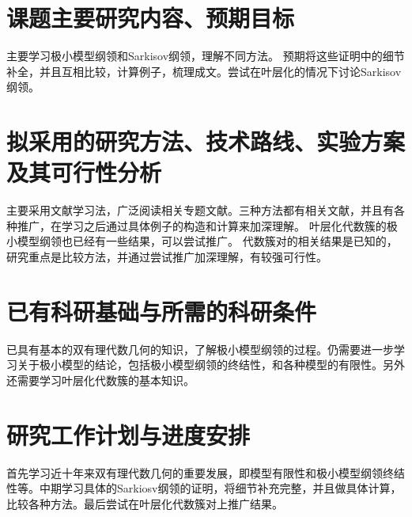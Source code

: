 \section{课题主要研究内容、预期目标}
主要学习极小模型纲领和Sarkisov纲领，理解不同方法。
预期将这些证明中的细节补全，并且互相比较，计算例子，梳理成文。尝试在叶层化的情况下讨论Sarkisov纲领。

\section{拟采用的研究方法、技术路线、实验方案及其可行性分析}
主要采用文献学习法，广泛阅读相关专题文献。三种方法都有相关文献，并且有各种推广，在学习之后通过具体例子的构造和计算来加深理解。
叶层化代数簇的极小模型纲领也已经有一些结果，可以尝试推广。
代数簇对的相关结果是已知的，研究重点是比较方法，并通过尝试推广加深理解，有较强可行性。

\section{已有科研基础与所需的科研条件}
已具有基本的双有理代数几何的知识，了解极小模型纲领的过程。仍需要进一步学习关于极小模型的结论，包括极小模型纲领的终结性，和各种模型的有限性。另外还需要学习叶层化代数簇的基本知识。
\section{研究工作计划与进度安排}

首先学习近十年来双有理代数几何的重要发展，即模型有限性和极小模型纲领终结性等。中期学习具体的Sarkiosv纲领的证明，将细节补充完整，并且做具体计算，比较各种方法。最后尝试在叶层化代数簇对上推广结果。


\nocite{*}%
